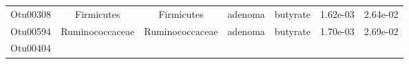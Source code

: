\documentclass[11pt,]{article}
\begin{document}
\begin{longtable}[]{@{}ccccccc@{}}
\begin{minipage}[t]{0.09\columnwidth}\centering\strut
Otu00308\strut
\end{minipage} & \begin{minipage}[t]{0.17\columnwidth}\centering\strut
Firmicutes\strut
\end{minipage} & \begin{minipage}[t]{0.17\columnwidth}\centering\strut
Firmicutes\strut
\end{minipage} & \begin{minipage}[t]{0.09\columnwidth}\centering\strut
adenoma\strut
\end{minipage} & \begin{minipage}[t]{0.11\columnwidth}\centering\strut
butyrate\strut
\end{minipage} & \begin{minipage}[t]{0.09\columnwidth}\centering\strut
1.62e-03\strut
\end{minipage} & \begin{minipage}[t]{0.09\columnwidth}\centering\strut
2.64e-02\strut
\end{minipage}\tabularnewline
\begin{minipage}[t]{0.09\columnwidth}\centering\strut
Otu00594\strut
\end{minipage} & \begin{minipage}[t]{0.17\columnwidth}\centering\strut
Ruminococcaceae\strut
\end{minipage} & \begin{minipage}[t]{0.17\columnwidth}\centering\strut
Ruminococcaceae\strut
\end{minipage} & \begin{minipage}[t]{0.09\columnwidth}\centering\strut
adenoma\strut
\end{minipage} & \begin{minipage}[t]{0.11\columnwidth}\centering\strut
butyrate\strut
\end{minipage} & \begin{minipage}[t]{0.09\columnwidth}\centering\strut
1.70e-03\strut
\end{minipage} & \begin{minipage}[t]{0.09\columnwidth}\centering\strut
2.69e-02\strut
\end{minipage}\tabularnewline
\begin{minipage}[t]{0.09\columnwidth}\centering\strut
Otu00404\strut
\end{minipage} & \begin{minipage}[t]{0.17\columnwidth}\centering\strut

\end{minipage}
\end{longtable}
\end{document}
